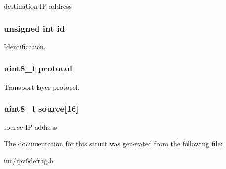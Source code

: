 destination I\-P address 

\hypertarget{structntoh__ipv6__tuple4__t_ab7ce6f462afaf105224b0ca772a33c43}{
\subsubsection[{id}]{\setlength{\rightskip}{0pt plus 5cm}unsigned int id}}\label{structntoh__ipv6__tuple4__t_ab7ce6f462afaf105224b0ca772a33c43}


Identification. 

\hypertarget{structntoh__ipv6__tuple4__t_ad124d3d2e02c729afa303c775295278e}{
\subsubsection[{protocol}]{\setlength{\rightskip}{0pt plus 5cm}uint8\-\_\-t protocol}}\label{structntoh__ipv6__tuple4__t_ad124d3d2e02c729afa303c775295278e}


Transport layer protocol. 

\hypertarget{structntoh__ipv6__tuple4__t_a6c2f6f541fb52e9338bada1c236125c1}{
\subsubsection[{source}]{\setlength{\rightskip}{0pt plus 5cm}uint8\-\_\-t source\mbox{[}16\mbox{]}}}\label{structntoh__ipv6__tuple4__t_a6c2f6f541fb52e9338bada1c236125c1}


source I\-P address 



The documentation for this struct was generated from the following file\-:\begin{DoxyCompactItemize}
\item 
inc/\hyperlink{ipv6defrag_8h}{ipv6defrag.\-h}\end{DoxyCompactItemize}
